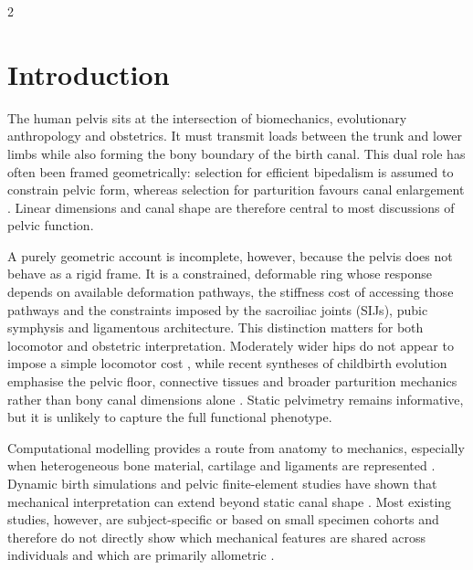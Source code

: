 \documentclass[openacc]{rsproca_new}
\begin{document}
\maketitle

\begin{multicols}{2}

\section{Introduction}

The human pelvis sits at the intersection of biomechanics, evolutionary anthropology and obstetrics. It must transmit loads between the trunk and lower limbs while also forming the bony boundary of the birth canal. This dual role has often been framed geometrically: selection for efficient bipedalism is assumed to constrain pelvic form, whereas selection for parturition favours canal enlargement \cite{RosenbergTrevathan2002,Trevathan2015,Grunstra2023}. Linear dimensions and canal shape are therefore central to most discussions of pelvic function.

A purely geometric account is incomplete, however, because the pelvis does not behave as a rigid frame. It is a constrained, deformable ring whose response depends on available deformation pathways, the stiffness cost of accessing those pathways and the constraints imposed by the sacroiliac joints (SIJs), pubic symphysis and ligamentous architecture. This distinction matters for both locomotor and obstetric interpretation. Moderately wider hips do not appear to impose a simple locomotor cost \cite{Warrener2015}, while recent syntheses of childbirth evolution emphasise the pelvic floor, connective tissues and broader parturition mechanics rather than bony canal dimensions alone \cite{Pavlicev2020,Haeusler2021,Grunstra2023}. Static pelvimetry remains informative, but it is unlikely to capture the full functional phenotype.

Computational modelling provides a route from anatomy to mechanics, especially when heterogeneous bone material, cartilage and ligaments are represented \cite{Eichenseer2011,Hammer2013,Salo2017,Ramezani2019,HammerKlima2019,Ricci2020,Henys2022}. Dynamic birth simulations and pelvic finite-element studies have shown that mechanical interpretation can extend beyond static canal shape \cite{Fremondiere2022}. Most existing studies, however, are subject-specific or based on small specimen cohorts and therefore do not directly show which mechanical features are shared across individuals and which are primarily allometric \cite{HammerKlima2019,Salo2017,Ramezani2019,DubeCyr2021}.


\end{multicols}
\end{document}

